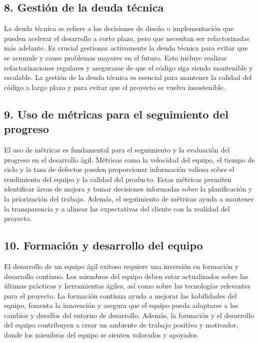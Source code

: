 \documentclass[12pt]{article}
\begin{document}
\subsection*{8. Gestión de la deuda técnica}
La deuda técnica se refiere a las decisiones de diseño o implementación que pueden acelerar el desarrollo a corto plazo, pero que necesitan ser refactorizadas más adelante. Es crucial gestionar activamente la deuda técnica para evitar que se acumule y cause problemas mayores en el futuro. Esto incluye realizar refactorizaciones regulares y asegurarse de que el código siga siendo mantenible y escalable. La gestión de la deuda técnica es esencial para mantener la calidad del código a largo plazo y para evitar que el proyecto se vuelva insostenible.

\subsection*{9. Uso de métricas para el seguimiento del progreso}
El uso de métricas es fundamental para el seguimiento y la evaluación del progreso en el desarrollo ágil. Métricas como la velocidad del equipo, el tiempo de ciclo y la tasa de defectos pueden proporcionar información valiosa sobre el rendimiento del equipo y la calidad del producto. Estas métricas permiten identificar áreas de mejora y tomar decisiones informadas sobre la planificación y la priorización del trabajo. Además, el seguimiento de métricas ayuda a mantener la transparencia y a alinear las expectativas del cliente con la realidad del proyecto.

\subsection*{10. Formación y desarrollo del equipo}
El desarrollo de un equipo ágil exitoso requiere una inversión en formación y desarrollo continuo. Los miembros del equipo deben estar actualizados sobre las últimas prácticas y herramientas ágiles, así como sobre las tecnologías relevantes para el proyecto. La formación continua ayuda a mejorar las habilidades del equipo, fomenta la innovación y asegura que el equipo pueda adaptarse a los cambios y desafíos del entorno de desarrollo. Además, la formación y el desarrollo del equipo contribuyen a crear un ambiente de trabajo positivo y motivador, donde los miembros del equipo se sienten valorados y apoyados.
\end{document}

